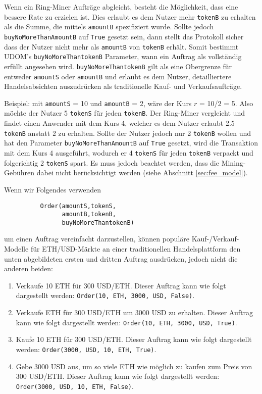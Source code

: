 \documentclass[UTF8,nofonts]{article}
\begin{document}
\begin{multicols}{2}
Wenn ein Ring-Miner Aufträge abgleicht, besteht die Möglichkeit, dass eine bessere Rate zu erzielen ist. Dies erlaubt es dem Nutzer mehr \verb|tokenB| zu erhalten als die Summe, die mittels \verb|amountB| spezifiziert wurde. Sollte jedoch \verb|buyNoMoreThanAmountB| auf \verb|True| gesetzt sein, dann stellt das Protokoll sicher dass der Nutzer nicht mehr als \verb|amountB| von \verb|tokenB| erhält. Somit bestimmt UDOM's \verb|buyNoMoreThantokenB| Parameter, wann ein Auftrag als vollständig erfüllt angesehen wird. \verb|buyNoMoreThantokenB| gilt als eine Obergrenze für entweder \verb|amountS| oder \verb|amountB| und erlaubt es dem Nutzer, detailliertere Handelsabsichten auszudrücken als traditionelle Kauf- und Verkaufsaufträge.

Beispiel: mit \verb|amountS| = 10 und \verb|amountB| = 2, wäre der Kurs $r$ = 10/2 = 5. Also möchte der Nutzer 5 \verb|tokenS| für jeden \verb|tokenB|. Der Ring-Miner vergleicht und findet einen Anwender mit dem Kurs 4, welcher es dem Nutzer erlaubt 2.5 \verb|tokenB| anstatt 2 zu erhalten. Sollte der Nutzer jedoch nur 2 \verb|tokenB| wollen und hat den Parameter \verb|buyNoMoreThanAmountB| auf \verb|True| gesetzt, wird die Transaktion mit dem Kurs 4 ausgeführt, wodurch er 4 \verb|tokenS| für jeden \verb|tokenB| verpackt und folgerichtig 2 \verb|tokenS| spart. Es muss jedoch beachtet werden, dass die Mining-Gebühren dabei nicht berücksichtigt werden (siehe Abschnitt \ref{sec:fee_model}).

Wenn wir Folgendes verwenden


\begin{verbatim}
	      Order(amountS,tokenS,
	            amountB,tokenB,
	            buyNoMoreThantokenB)
\end{verbatim}

um einen Auftrag vereinfacht darzustellen, können populäre Kauf-/Verkauf-Modelle für ETH/USD-Märkte an einer traditionellen Handelsplattform den unten abgebildeten ersten und dritten Auftrag ausdrücken, jedoch nicht die anderen beiden:

\begin{enumerate}
	\item Verkaufe 10 ETH für 300 USD/ETH. Dieser Auftrag kann wie folgt dargestellt werden: \verb|Order(10, ETH, 3000, USD, False)|.
	\item Verkaufe ETH für 300 USD/ETH um 3000 USD zu erhalten. Dieser Auftrag kann wie folgt dargestellt werden: \verb|Order(10, ETH, 3000, USD, True)|.
	\item Kaufe 10 ETH für 300 USD/ETH. Dieser Auftrag kann wie folgt dargestellt werden: \verb|Order(3000, USD, 10, ETH, True)|.
	\item Gebe 3000 USD aus, um so viele ETH wie möglich zu kaufen zum Preis von 300 USD/ETH. Dieser Auftrag kann wie folgt dargestellt werden: \verb|Order(3000, USD, 10, ETH, False)|.
\end{enumerate}




\end{multicols}
\end{document}

